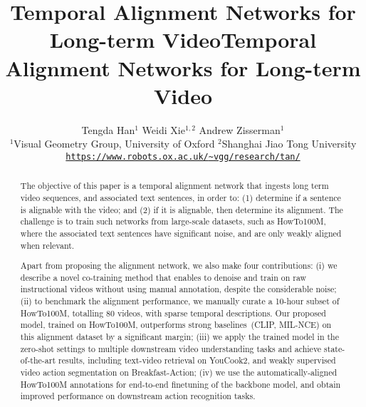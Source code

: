\title{Temporal Alignment Networks for Long-term Video}



\title{Temporal Alignment Networks for Long-term Video}

\author{%
  Tengda Han$^1$ \quad Weidi Xie$^{1,2}$ \quad Andrew Zisserman$^1$ \\
  $^1$Visual Geometry Group,  University of Oxford \hspace{5pt}
$^2$Shanghai Jiao Tong University\\
  \normalsize{\href{https://www.robots.ox.ac.uk/~vgg/research/tan/}
  {\texttt{https://www.robots.ox.ac.uk/{\textasciitilde}vgg/research/tan/}}} \\  
}

\maketitle

\begin{abstract}
\vspace{-4mm}
The objective of this paper is a temporal alignment network 
that ingests long term video sequences, and associated text sentences, 
in order to: 
(1) determine if a sentence is alignable with the video; 
and (2) if it is alignable, then determine its alignment.
The challenge is to train such networks from large-scale datasets, 
such as HowTo100M, where the associated text sentences have significant noise, 
and are only weakly aligned when relevant.

Apart from proposing the alignment network, 
we also make four contributions:
(i) we describe a novel co-training method 
that enables to denoise and train on raw instructional videos 
without using manual annotation, 
despite the considerable noise;
(ii) to benchmark the alignment performance, 
we manually curate a 10-hour subset of HowTo100M, totalling 80 videos, 
with sparse temporal descriptions.
Our proposed model, trained on HowTo100M, 
outperforms strong baselines~(CLIP, MIL-NCE) on this alignment dataset by a significant margin;
(iii) we apply the trained model in the zero-shot settings to multiple downstream video understanding tasks 
and achieve state-of-the-art results, including text-video retrieval on YouCook2, 
and weakly supervised video action segmentation on Breakfast-Action;
(iv) we use the automatically-aligned HowTo100M annotations for
end-to-end finetuning of the backbone model, and obtain
improved performance
on downstream action recognition tasks.
\end{abstract}
\vspace{-6mm}
